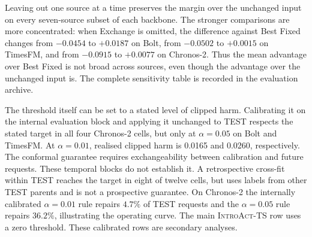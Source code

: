 \documentclass{article}
\newcommand{\introact}{\textsc{IntroAct-TS}}
\begin{document}
Leaving out one source at a time preserves the margin over the unchanged input on every
seven-source subset of each backbone. The stronger comparisons are more concentrated: when
Exchange is omitted, the difference against Best Fixed changes from $-0.0454$ to $+0.0187$
on Bolt, from $-0.0502$ to $+0.0015$ on TimesFM, and from $-0.0915$ to $+0.0077$ on
Chronos-2. Thus the mean advantage over Best Fixed is not broad across sources, even though
the advantage over the unchanged input is. The complete sensitivity table is recorded
in the evaluation archive.



The threshold itself can be set to a stated level of clipped harm. Calibrating it on the
internal evaluation block and applying it unchanged to TEST respects the stated target in
all four Chronos-2 cells, but only at $\alpha=0.05$ on Bolt and TimesFM. At $\alpha=0.01$,
realised clipped harm is 0.0165 and 0.0260, respectively. The conformal guarantee requires
exchangeability between calibration and future requests. These temporal blocks do not
establish it. A retrospective cross-fit within TEST reaches the target in eight of twelve
cells, but uses labels from other TEST parents and is not a prospective guarantee. On
Chronos-2 the internally calibrated $\alpha=0.01$ rule repairs $4.7\%$ of TEST requests and
the $\alpha=0.05$ rule repairs $36.2\%$, illustrating the operating curve. The main
\introact{} row uses a zero threshold. These calibrated rows are secondary analyses.

\begin{table}[t]
  \caption{Retrospective TEST cross-fit of the execution threshold: each half of the parents
  supplies completed-request labels to calibrate the other half. These rows are not an
  independent prospective test. Target is clipped harmful loss, realised is the empirical
  clipped value, and repair rate is the executed share.}
  \label{tab:conformal}
  \centering
  \small
  \setlength{\tabcolsep}{5pt}
\end{table}
\end{document}
